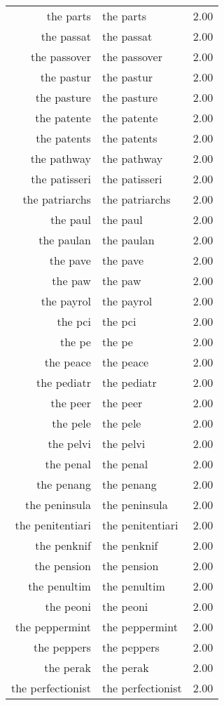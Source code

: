 \begin{table}[ht]
\begin{tabular}{rlr}
  the parts & the parts & 2.00 \\ 
  the passat & the passat & 2.00 \\ 
  the passover & the passover & 2.00 \\ 
  the pastur & the pastur & 2.00 \\ 
  the pasture & the pasture & 2.00 \\ 
  the patente & the patente & 2.00 \\ 
  the patents & the patents & 2.00 \\ 
  the pathway & the pathway & 2.00 \\ 
  the patisseri & the patisseri & 2.00 \\ 
  the patriarchs & the patriarchs & 2.00 \\ 
  the paul & the paul & 2.00 \\ 
  the paulan & the paulan & 2.00 \\ 
  the pave & the pave & 2.00 \\ 
  the paw & the paw & 2.00 \\ 
  the payrol & the payrol & 2.00 \\ 
  the pci & the pci & 2.00 \\ 
  the pe & the pe & 2.00 \\ 
  the peace & the peace & 2.00 \\ 
  the pediatr & the pediatr & 2.00 \\ 
  the peer & the peer & 2.00 \\ 
  the pele & the pele & 2.00 \\ 
  the pelvi & the pelvi & 2.00 \\ 
  the penal & the penal & 2.00 \\ 
  the penang & the penang & 2.00 \\ 
  the peninsula & the peninsula & 2.00 \\ 
  the penitentiari & the penitentiari & 2.00 \\ 
  the penknif & the penknif & 2.00 \\ 
  the pension & the pension & 2.00 \\ 
  the penultim & the penultim & 2.00 \\ 
  the peoni & the peoni & 2.00 \\ 
  the peppermint & the peppermint & 2.00 \\ 
  the peppers & the peppers & 2.00 \\ 
  the perak & the perak & 2.00 \\ 
  the perfectionist & the perfectionist & 2.00 \\ 

\end{tabular}
\end{table}
